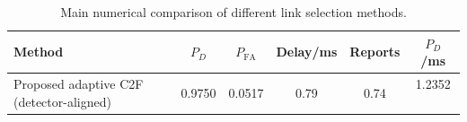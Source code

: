 \begin{table}[t]
    \centering
    \caption{Main numerical comparison of different link selection methods.}
    \label{tab:main_summary}
    \begin{tabular}{l c c c c c}
        \hline
        Method & $P_D$ & $P_{\mathrm{FA}}$ & Delay/ms & Reports & $P_D$/ms \\
        \hline
        Proposed adaptive C2F (detector-aligned) & 0.9750 & 0.0517 & 0.79 & 0.74 & 1.2352 \
        \hline
    \end{tabular}
\end{table}
